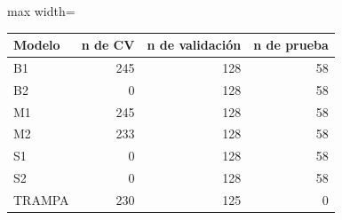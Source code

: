 \begin{center}\small\setlength{\tabcolsep}{4pt}
\begin{adjustbox}{max width=\textwidth}\begin{tabular}{lrrr}
\toprule
Modelo & n de CV & n de validación & n de prueba \\ \midrule
B1 & 245 & 128 & 58 \\
B2 & 0 & 128 & 58 \\
M1 & 245 & 128 & 58 \\
M2 & 233 & 128 & 58 \\
S1 & 0 & 128 & 58 \\
S2 & 0 & 128 & 58 \\
TRAMPA & 230 & 125 & 0 \\
\bottomrule\end{tabular}\end{adjustbox}\end{center}
